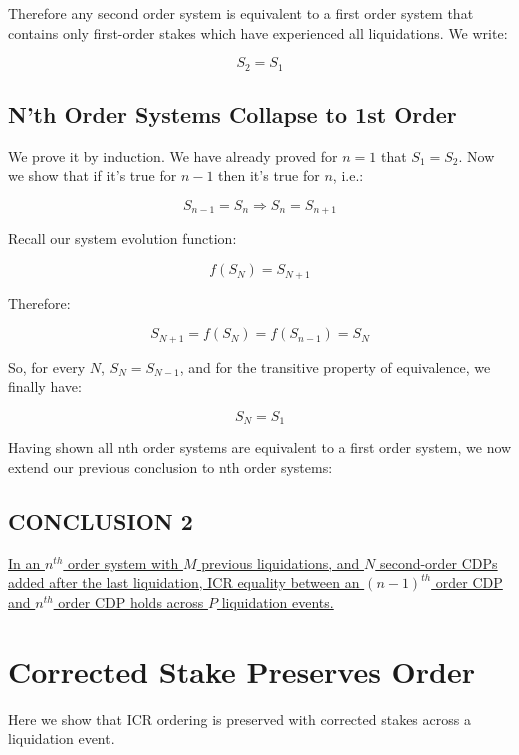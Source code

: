 \documentclass[reqno]{article}
\begin{document}
Therefore any second order system is equivalent to a first order system that contains only first-order stakes which have experienced all liquidations. We write:

\begin{equation} 
    S_2=S_1
\end{equation}

\subsection{N’th Order Systems Collapse to 1st Order}
We prove it by induction. We have already proved for $n=1$ that $S_1=S_2$.
Now we show that if it’s true for $n-1$ then it’s true for $n$, i.e.:

\begin{equation}
    S_{n-1} = S_n \Rightarrow S_n = S_{n+1}
\end{equation}

Recall our system evolution function: 

\begin{equation} 
    f(S_N)=S_{N+1}
\end{equation}

Therefore:

\begin{equation} 
    S_{N+1} = f(S_N) = f(S_{n-1}) = S_N
\end{equation}

\bigskip
So, for every $N$, $S_N = S_{N-1}$, and for the transitive property of equivalence, we finally have:

\begin{equation}
    S_N=S_1
\end{equation}

\bigskip
Having shown all nth order systems are equivalent to a first order system, we now extend our previous conclusion to nth order systems:

\subsection{CONCLUSION 2}

\uline{In an $n^{th}$ order system with $M$ previous liquidations, and $N$ second-order CDPs added after the last liquidation, ICR equality between an $(n-1)^{th}$ order CDP and $n^{th}$ order CDP holds across $P$ liquidation events.}

\section{Corrected Stake Preserves Order}
Here we show that ICR ordering is preserved with corrected stakes across a liquidation event.\\
\end{document}
